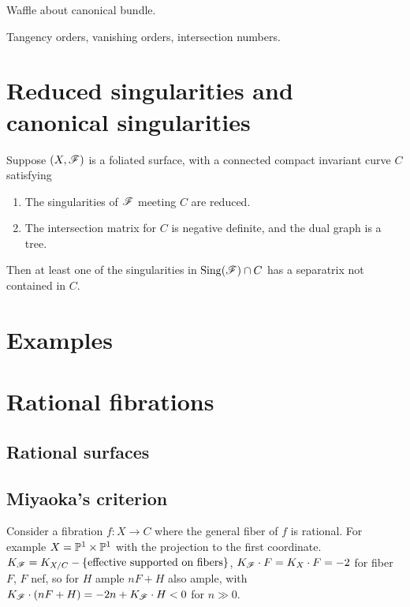 Waffle about canonical bundle.

Tangency orders, vanishing orders, intersection numbers.

\section{Reduced singularities and canonical singularities}



\begin{theorem}\label{thm:reduced separatrix}
    Suppose $(X,\scrF)$ is a foliated surface, with a connected compact
    invariant curve $C$ satisfying
    \begin{enumerate}[label=\roman*.]
        \item The singularities of $\scrF$ meeting $C$ are reduced.
        \item The intersection matrix for $C$ is negative definite, and the dual
            graph is a tree.
    \end{enumerate}
    Then at least one of the singularities in $\Sing(\scrF)\cap C$ has a
    separatrix not contained in $C$.
\end{theorem}

\section{Examples}


\section{Rational fibrations}


\subsection{Rational surfaces}

\subsection{Miyaoka's criterion}

Consider a fibration $f:X\to C$ where the general fiber of $f$ is rational. For
example $X=\P^1\times\P^1$ with the projection to the first coordinate.
$K_\scrF=K_{X/C}-\{\text{effective supported on fibers}\}$,
$K_\scrF\cdot F=K_X\cdot F=-2$ for fiber $F$, $F$ nef, so for $H$ ample $nF+H$
also ample, with $K_\scrF\cdot(nF+H)=-2n+K_\scrF\cdot H<0$ for $n\gg0$.

